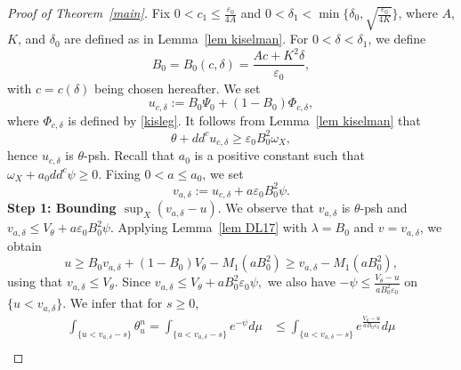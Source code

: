 \documentclass[a4paper,11pt]{amsart}
\numberwithin{equation}{section}
\theoremstyle{definition}
\newcommand{\ddc}{dd^c}
\begin{document}
\begin{proof}[Proof of Theorem~\ref{main}]
Fix $0<c_1\leq \frac{\varepsilon_0}{4A}$ 
and $0<\delta_1<\min\{\delta_0, \sqrt{\frac{\varepsilon_0}{4K}}\}$, where $A$, $K$, and $\delta_0$ are defined as in Lemma~\ref{lem kiselman}. For $0<\delta<\delta_1$,
we define
\begin{equation}\label{eq: constantB0}
B_0=B_0(c, \delta)=\frac{Ac+K^2\delta}{\varepsilon_0},
\end{equation}
with $c=c(\delta)$ being chosen hereafter. We set
\begin{equation}\label{eq: u c delta}
u_{c, \delta}:=B_0\Psi_0+(1-B_0)\Phi_{c, \delta},
\end{equation}
where $\Phi_{c, \delta}$ is defined by \eqref{kisleg}. It follows from Lemma~\ref{lem kiselman} that $$\theta+\ddc u_{c,\delta} \geq \varepsilon_0B_0^2\omega_X,$$ hence $u_{c,\delta}$ is $\theta$-psh. 
Recall that $a_0$ is a positive constant such that $\omega_X+a_0\ddc\psi\geq 0$. Fixing $0<a\leq a_0$, we set $$v_{a, \delta}:=u_{c, \delta}+ a\varepsilon_0B_0^2\psi.$$
\smallskip
 \textbf{Step 1: Bounding $\sup_X(v_{a,\delta}-u)$}. 
  We observe that $v_{a, \delta}$ is $\theta$-psh and $v_{a, \delta}\leq V_{\theta}+a \varepsilon_0B_0^2\psi.$ 
 Applying Lemma~\ref{lem DL17} with $\lambda=B_0$ and $v=v_{a, \delta}$, we obtain 
 \begin{equation}\label{eq1main}
 u\geq B_0v_{a, \delta}+(1-B_0)V_\theta -M_1(aB_0^2)\geq v_{a, \delta}-M_1(aB_0^2),
 \end{equation} using that $v_{a,\delta}\leq V_\theta$. 
 Since $v_{a, \delta}\leq V_{\theta}+aB_0^2 \varepsilon_0\psi,$ we also have $-\psi\leq \frac{V_{\theta}-u}{aB_0^2\varepsilon_0}$
 on $\{u<v_{a, \delta}\}$. We infer that for $s\geq 0$,
 \begin{align*}
\int_{\{u<v_{a, \delta}-s\}}\theta_{u}^n=\int_{\{u<v_{a, \delta}-s\}}e^{-\psi}d\mu 
		&\leq \int_{\{u<v_{a, \delta}-s\}}e^{\frac{V_{\theta}-u}{aB_0\varepsilon_0}}d\mu\\

\end{align*}
\end{proof}
\end{document}
